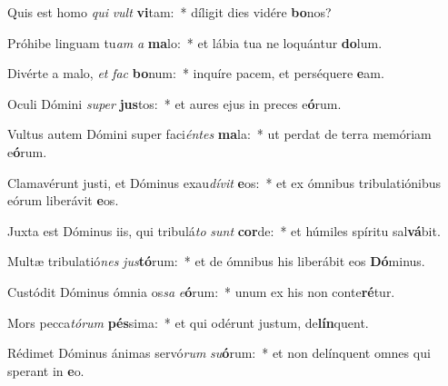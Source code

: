 \item Quis est homo \textit{qui} \textit{vult} \textbf{vi}tam:~* díligit dies vidére \textbf{bo}nos?
\item Próhibe linguam tu\textit{am} \textit{a} \textbf{ma}lo:~* et lábia tua ne loquántur \textbf{do}lum.
\item Divérte a malo, \textit{et} \textit{fac} \textbf{bo}num:~* inquíre pacem, et perséquere \textbf{e}am.
\item Oculi Dómini \textit{su}\textit{per} \textbf{jus}tos:~* et aures ejus in preces e\textbf{ó}rum.
\item Vultus autem Dómini super faci\textit{én}\textit{tes} \textbf{ma}la:~* ut perdat de terra memóriam e\textbf{ó}rum.
\item Clamavérunt justi, et Dóminus exau\textit{dí}\textit{vit} \textbf{e}os:~* et ex ómnibus tribulatiónibus eórum liberávit \textbf{e}os.
\item Juxta est Dóminus iis, qui tribulá\textit{to} \textit{sunt} \textbf{cor}de:~* et húmiles spíritu sal\textbf{vá}bit.
\item Multæ tribulatió\textit{nes} \textit{jus}\textbf{tó}rum:~* et de ómnibus his liberábit eos \textbf{Dó}minus.
\item Custódit Dóminus ómnia os\textit{sa} \textit{e}\textbf{ó}rum:~* unum ex his non conte\textbf{ré}tur.
\item Mors pecca\textit{tó}\textit{rum} \textbf{pés}sima:~* et qui odérunt justum, de\textbf{lín}quent.
\item Rédimet Dóminus ánimas servó\textit{rum} \textit{su}\textbf{ó}rum:~* et non delínquent omnes qui sperant in \textbf{e}o.

